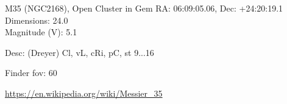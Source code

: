 \begin{block}{M35 (NGC2168), Open Cluster in Gem}
    RA: 06:09:05.06, Dec: +24:20:19.1 \\ 
    Dimensions: 24.0 \\ 
    Magnitude (V): 5.1


    Desc: (Dreyer) Cl, vL, cRi, pC, st 9...16 

    Finder fov: 60 

    \url{https://en.wikipedia.org/wiki/Messier_35} 
\end{block}
